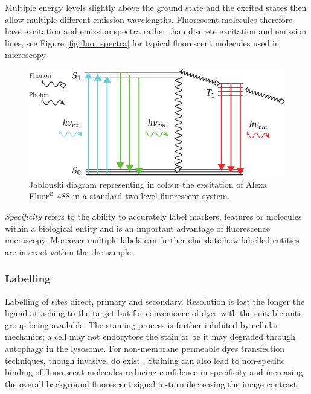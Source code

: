 
Multiple energy levels slightly above the ground state and the excited states then allow multiple different emission wavelengths.
Fluorescent molecules therefore have excitation and emission spectra rather than discrete excitation and emission lines, see Figure \ref{fig:fluo_spectra} for typical fluorescent molecules used in microscopy.

\begin{figure}
    \centering
    \includegraphics[width=0.7\linewidth]{jablonski_triplet_new}
    \caption[Standard jablonski diagram]{Jablonski diagram representing in colour the excitation of Alexa Fluor\(^{\copyright}\) 488 in a standard two level fluorescent system.}\label{fig:jablonski_triplet_new}
\end{figure}


\emph{Specificity} refers to the ability to accurately label markers, features or molecules within a biological entity and is an important advantage of fluorescence microscopy.
Moreover multiple labels can further elucidate how labelled entities are interact within the the sample.

\subsubsection{Labelling}


Labelling of sites direct, primary and secondary.
Resolution is lost the longer the ligand attaching to the target but for convenience of dyes with the suitable anti-group being available.
The staining process is further inhibited by cellular mechanics; a cell may not endocytose the stain or be it may degraded through autophagy in the lysosome.
For non-membrane permeable dyes transfection techniques, though invasive, do exist \cite{}.
Staining can also lead to non-specific binding of fluorescent molecules reducing confidence in specificity and increasing the overall background fluorescent signal in-turn decreasing the image contrast.

